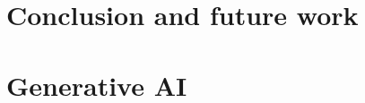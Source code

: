 \documentclass[conference]{IEEEtran}
\begin{document}
\section{Conclusion and future work}




\section*{Generative AI}

\printbibliography


	
\end{document}
